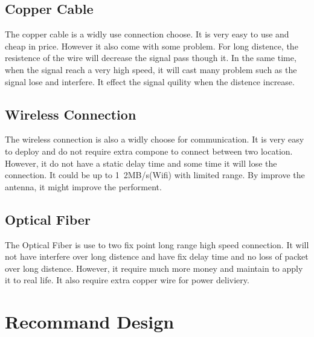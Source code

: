 \documentclass[12pt,article]{memoir}
\begin{document}
\section{Copper Cable}
The copper cable is a widly use connection choose. It is very easy to use and cheap in price. However it also come with some problem. For long distence, the resistence of the wire will decrease the signal pass though it. In the same time, when the signal reach a very high speed, it will cast many problem such as the signal lose and interfere. It effect the signal quility when the distence increase.
\section{Wireless Connection}
The wireless connection is also a widly choose for communication. It is very easy to deploy and do not require extra compone to connect between two location. However, it do not have a static delay time and some time it will lose the connection. It could be up to 1~2MB/s(Wifi) with limited range. By improve the antenna, it might improve the performent.
\section{Optical Fiber}
The Optical Fiber is use to two fix point long range high speed connection. It will not have interfere over long distence and have fix delay time and no loss of packet over long distence. However, it require much more money and maintain to apply it to real life. It also require extra copper wire for power deliviery.
\newpage
\chapter{Recommand Design}
\end{document}
